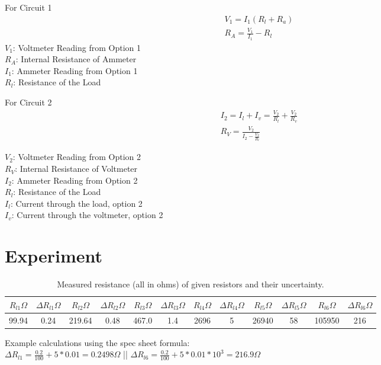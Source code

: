 \documentclass[12pt]{article}
\begin{document}
For Circuit 1
\begin{align}
    V_1=I_1(R_l+R_a) \\
    R_{A}=\frac{V_1}{I_1} - R_l
    \label{eq:Ra}
\end{align}
$V_1$: Voltmeter Reading from Option 1 \\
$R_A$: Internal Resistance of Ammeter \\
$I_1$: Ammeter Reading from Option 1 \\
$R_l$: Resistance of the Load 

For Circuit 2
\begin{align}
    I_2=I_l+I_v=\frac{V_2}{R_l}+\frac{V_2}{R_v}\\
    R_{V}=\frac{V_2}{I_2 - \frac{V_2}{R_l}}
    \label{eq:Rv}
\end{align}

$V_2$: Voltmeter Reading from Option 2 \\
$R_V$: Internal Resistance of Voltmeter \\
$I_2$: Ammeter Reading from Option 2 \\
$R_l$: Resistance of the Load \\
$I_l$: Current through the load, option 2 \\
$I_v$: Current through the voltmeter, option 2
\section{Experiment}

\begin{table}[H]
\begin{tabular}{| c | c | c | c | c | c | c | c | c | c | c | c |}
    \hline	
    $R_{l1} \Omega$ & $\Delta R_{l1} \Omega$ &
    $R_{l2} \Omega$ & $\Delta R_{l2} \Omega$ &
    $R_{l3} \Omega$ & $\Delta R_{l3} \Omega$ &
    $R_{l4} \Omega$ & $\Delta R_{l4} \Omega$ &
    $R_{l5} \Omega$ & $\Delta R_{l5} \Omega$ &
    $R_{l6} \Omega$ & $\Delta R_{l6} \Omega$ \\
    \hline
    99.94 & 0.24 & 219.64 & 0.48 & 467.0 & 1.4 & 2696 & 5 & 26940 & 58 & 105950 & 216 \\
    \hline
\end{tabular}
\caption{Measured resistance (all in ohms) of given resistors and their uncertainty.}
\label{table:1}
\end{table}

Example calculations using the spec sheet formula: \\
        $\Delta R_{l1} = \frac{0.2}{100} + 5 * 0.01 = 0.2498 \Omega$ ||
        $\Delta R_{l6} = \frac{0.2}{100} + 5 * 0.01 * 10^3 = 216.9 \Omega$
\end{document}
